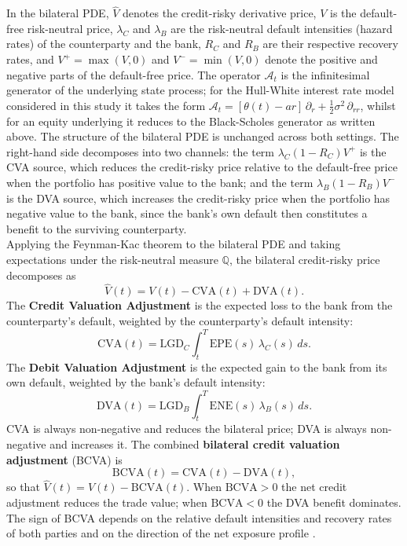     \noindent
    In the bilateral PDE, $\hat{V}$ denotes the credit-risky derivative price, $V$ is the default-free risk-neutral price, $\lambda_C$ and $\lambda_B$ are the risk-neutral default intensities (hazard rates) of the counterparty and the bank, $R_C$ and $R_B$ are their respective recovery rates, and $V^+ = \max(V,0)$ and $V^- = \min(V,0)$ denote the positive and negative parts of the default-free price. The operator $\mathcal{A}_t$ is the infinitesimal generator of the underlying state process; for the Hull-White interest rate model considered in this study it takes the form $\mathcal{A}_t = [\theta(t) - ar]\,\partial_r + \tfrac{1}{2}\sigma^2\,\partial_{rr}$, whilst for an equity underlying it reduces to the Black-Scholes generator as written above. The structure of the bilateral PDE is unchanged across both settings. The right-hand side decomposes into two channels: the term $\lambda_C(1-R_C)V^+$ is the CVA source, which reduces the credit-risky price relative to the default-free price when the portfolio has positive value to the bank; and the term $\lambda_B(1-R_B)V^-$ is the DVA source, which increases the credit-risky price when the portfolio has negative value to the bank, since the bank's own default then constitutes a benefit to the surviving counterparty. \\

    \noindent
    Applying the Feynman-Kac theorem to the bilateral PDE and taking expectations under the risk-neutral measure $\mathbb{Q}$, the bilateral credit-risky price decomposes as \cite{pde_2011, brigo2013counterparty}
    \begin{equation}
        \hat{V}(t) = V(t) - \text{CVA}(t) + \text{DVA}(t).
        \label{eq:bilateral-price}
    \end{equation}
    The \textbf{Credit Valuation Adjustment} is the expected loss to the bank from the counterparty's default, weighted by the counterparty's default intensity:
    \begin{equation}
        \text{CVA}(t) = \text{LGD}_C \int_t^T \text{EPE}(s)\,\lambda_C(s)\,ds.
        \label{eq:CVA}
    \end{equation}
    The \textbf{Debit Valuation Adjustment} is the expected gain to the bank from its own default, weighted by the bank's default intensity:
    \begin{equation}
        \text{DVA}(t) = \text{LGD}_B \int_t^T \text{ENE}(s)\,\lambda_B(s)\,ds.
        \label{eq:DVA}
    \end{equation}
    CVA is always non-negative and reduces the bilateral price; DVA is always non-negative and increases it. The combined \textbf{bilateral credit valuation adjustment} (BCVA) is
    \begin{equation}
        \text{BCVA}(t) = \text{CVA}(t) - \text{DVA}(t),
        \label{eq:BCVA}
    \end{equation}
    so that $\hat{V}(t) = V(t) - \text{BCVA}(t)$. When $\text{BCVA} > 0$ the net credit adjustment reduces the trade value; when $\text{BCVA} < 0$ the DVA benefit dominates. The sign of BCVA depends on the relative default intensities and recovery rates of both parties and on the direction of the net exposure profile \cite{Green_2016, Gregory_2015}. \\

